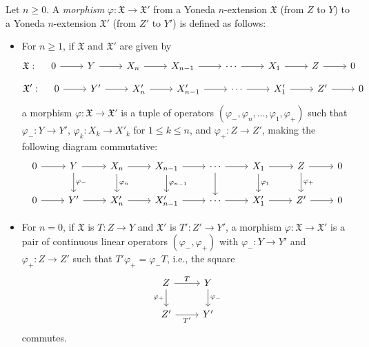 \documentclass[12pt,a4paper]{amsproc}
\theoremstyle{remark}
\theoremstyle{definition}
\numberwithin{equation}{section}
\begin{document}
\par Let $n \ge 0$. A \emph{morphism} $\varphi: \mathfrak{X} \to \mathfrak{X}'$ from a Yoneda $n$-extension $\mathfrak{X}$ (from $Z$ to $Y$) to a Yoneda $n$-extension $\mathfrak{X}'$ (from $Z'$ to $Y'$) is defined as follows:
\begin{itemize}
    \item For $n \ge 1$, if $\mathfrak{X}$ and $\mathfrak{X}'$ are given by
    \begin{equation}\notag
\mathfrak{X}: \quad
\begin{tikzcd}
	0 \arrow[r] & Y \arrow[r] & X_n \arrow[r] & X_{n-1} \arrow[r] & \cdots \arrow[r] & X_1 \arrow[r] & Z \arrow[r] & 0
\end{tikzcd}
\end{equation}
\begin{equation}\notag
\mathfrak{X'}: \quad
\begin{tikzcd}
    0 \arrow[r] & Y' \arrow[r] & X'_n \arrow[r] & X'_{n-1} \arrow[r] & \cdots \arrow[r] & X'_1 \arrow[r] & Z' \arrow[r] & 0
\end{tikzcd}
\end{equation}
    a morphism $\varphi: \mathfrak{X} \to \mathfrak{X}'$ is a tuple of operators $(\varphi_{-}, \varphi_n, \dots, \varphi_1, \varphi_+)$ such that $\varphi_-: Y \to Y'$, $\varphi_k: X_k \to X'_k$ for $1 \le k \leq n$, and $\varphi_+: Z \to Z'$, making the following diagram commutative:
    \begin{equation}
		\notag
		\begin{tikzcd}
			0 \arrow[r] & Y \arrow[r] \arrow[d, "\varphi_-"] & X_n \arrow[r] \arrow[d, "\varphi_n"] & X_{n-1} \arrow[r] \arrow[d, "\varphi_{n-1}"] & \cdots \arrow[r] \arrow[d] & X_1 \arrow[r] \arrow[d, "\varphi_1"] & Z \arrow[r] \arrow[d, "\varphi_+"] & 0 \\
			0 \arrow[r] & Y' \arrow[r]                       & X'_n \arrow[r]                        & X'_{n-1} \arrow[r]                            & \cdots \arrow[r]           & X'_1 \arrow[r]                        & Z' \arrow[r]                       & 0
		\end{tikzcd}
	\end{equation}
    \item For $n = 0$, if $\mathfrak{X}$ is $T: Z \to Y$ and $\mathfrak{X}'$ is $T': Z' \to Y'$, a morphism $\varphi: \mathfrak{X} \to \mathfrak{X}'$ is a pair of continuous linear operators $(\varphi_-, \varphi_+)$ with $\varphi_-: Y \to Y'$ and $\varphi_+: Z \to Z'$ such that $T' \varphi_+=\varphi_-T$, i.e., the square
    \begin{equation} \notag
    \begin{tikzcd}
        Z \arrow[r, "T"] \arrow[d, "\varphi_+"'] & Y \arrow[d, "\varphi_-"] \\
        Z' \arrow[r, "T'"'] & Y'
    \end{tikzcd}
    \end{equation}
    commutes.
\end{itemize}
\end{document}
